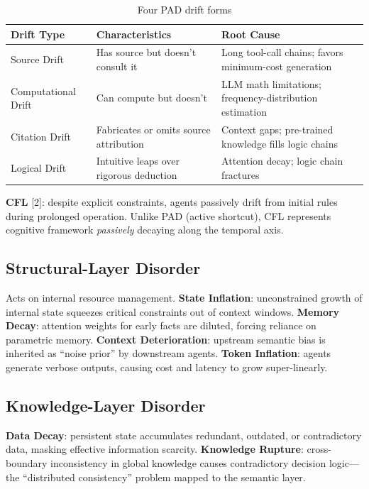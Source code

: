 \documentclass[11pt,a4paper]{article}
\begin{document}
\begin{table}[H]
\centering
\small
\begin{tabular}{p{}p{}p{}}
\toprule
\textbf{Drift Type} & \textbf{Characteristics} & \textbf{Root Cause} \\
\midrule
Source Drift & Has source but doesn't consult it & Long tool-call chains; favors minimum-cost generation \\
Computational Drift & Can compute but doesn't & LLM math limitations; frequency-distribution estimation \\
Citation Drift & Fabricates or omits source attribution & Context gaps; pre-trained knowledge fills logic chains \\
Logical Drift & Intuitive leaps over rigorous deduction & Attention decay; logic chain fractures \\
\bottomrule
\end{tabular}
\caption{Four PAD drift forms}
\label{tab:pad-forms}
\end{table}

\textbf{CFL} [2]: despite explicit constraints, agents passively drift from initial rules during prolonged operation. Unlike PAD (active shortcut), CFL represents cognitive framework \emph{passively} decaying along the temporal axis.

\subsection{Structural-Layer Disorder}
\label{sec:structural}

Acts on internal resource management. \textbf{State Inflation}: unconstrained growth of internal state squeezes critical constraints out of context windows. \textbf{Memory Decay}: attention weights for early facts are diluted, forcing reliance on parametric memory. \textbf{Context Deterioration}: upstream semantic bias is inherited as ``noise prior'' by downstream agents. \textbf{Token Inflation}: agents generate verbose outputs, causing cost and latency to grow super-linearly.

\subsection{Knowledge-Layer Disorder}
\label{sec:knowledge}

\textbf{Data Decay}: persistent state accumulates redundant, outdated, or contradictory data, masking effective information scarcity. \textbf{Knowledge Rupture}: cross-boundary inconsistency in global knowledge causes contradictory decision logic---the ``distributed consistency'' problem mapped to the semantic layer.
\end{document}
